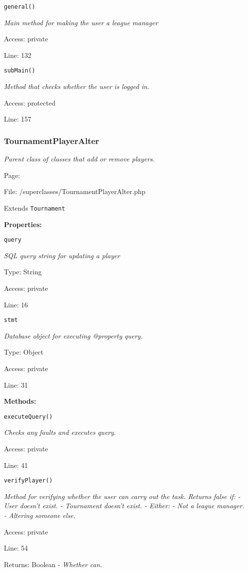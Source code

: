 \texttt{general()}

{\scriptsize
\textit{Main method for making the user a league manager}

Access: private

Line: 132

}

\texttt{subMain()}

{\scriptsize
\textit{Method that checks whether the user is logged in.}

Access: protected

Line: 157

}

\subsubsection{TournamentPlayerAlter}\label{TournamentPlayerAlter.php.doc}
\textit{Parent class of classes that add or remove players.}

Page: \pageref{TournamentPlayerAlter.php}

File: /superclasses/TournamentPlayerAlter.php

Extends \texttt{Tournament}

\textbf{Properties:}

\texttt{query}

{\scriptsize
\textit{SQL query string for updating a player}

Type: String

Access: private

Line: 16

}
\texttt{stmt}

{\scriptsize
\textit{Database object for executing @property query.}

Type: Object

Access: private

Line: 31

}
\textbf{Methods:}

\texttt{executeQuery()}

{\scriptsize
\textit{Checks any faults and executes query.}

Access: private

Line: 41

}

\texttt{verifyPlayer()}

{\scriptsize
\textit{Method for verifying whether the user can carry out the task.
Returns false if:
- User doesn't exist.
- Tournament doesn't exist.
- Either:
  - Not a league manager.
  - Altering someone else.}

Access: private

Line: 54

Returns: Boolean - \textit{Whether can.}

}

